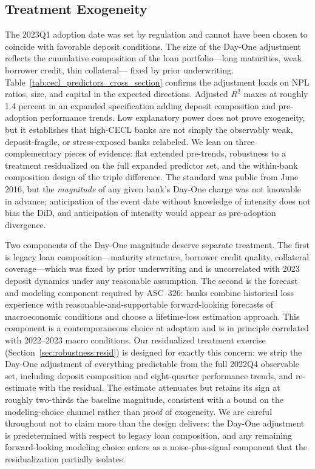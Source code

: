 \subsection{Treatment Exogeneity}
\label{sec:identification:predetermination}

The 2023Q1 adoption date was set by regulation and cannot have been
chosen to coincide with favorable deposit conditions.  The size of the
Day-One adjustment reflects the cumulative composition of the loan
portfolio---long maturities, weak borrower credit, thin collateral---%
fixed by prior underwriting.
Table~\ref{tab:cecl_predictors_cross_section} confirms the adjustment
loads on NPL ratios, size, and capital in the expected directions.
Adjusted $R^2$ maxes at roughly 1.4 percent in an expanded specification
adding deposit composition and pre-adoption performance trends.  Low
explanatory power does not prove exogeneity, but it establishes that
high-CECL banks are not simply the observably weak, deposit-fragile, or
stress-exposed banks relabeled.  We lean on three complementary pieces
of evidence: flat extended pre-trends, robustness to a treatment
residualized on the full expanded predictor set, and the within-bank
composition design of the triple difference.  The standard was public
from June 2016, but the \emph{magnitude} of any given bank's Day-One
charge was not knowable in advance; anticipation of the event date
without knowledge of intensity does not bias the DiD, and anticipation
of intensity would appear as pre-adoption divergence.

Two components of the Day-One magnitude deserve separate treatment.
The first is legacy loan composition---maturity structure, borrower
credit quality, collateral coverage---which was fixed by prior
underwriting and is uncorrelated with 2023 deposit dynamics under any
reasonable assumption.  The second is the forecast and modeling
component required by ASC~326: banks combine historical loss experience
with reasonable-and-supportable forward-looking forecasts of
macroeconomic conditions and choose a lifetime-loss estimation approach.
This component is a contemporaneous choice at adoption and is in
principle correlated with 2022--2023 macro conditions.  Our residualized
treatment exercise
(Section~\ref{sec:robustness:resid}) is designed for exactly this
concern: we strip the Day-One adjustment of everything predictable from
the full 2022Q4 observable set, including deposit composition and
eight-quarter performance trends, and re-estimate with the residual.
The estimate attenuates but retains its sign at roughly two-thirds the
baseline magnitude, consistent with a bound on the modeling-choice
channel rather than proof of exogeneity.  We are careful throughout not
to claim more than the design delivers: the Day-One adjustment is
predetermined with respect to legacy loan composition, and any
remaining forward-looking modeling choice enters as a noise-plus-signal
component that the residualization partially isolates.

